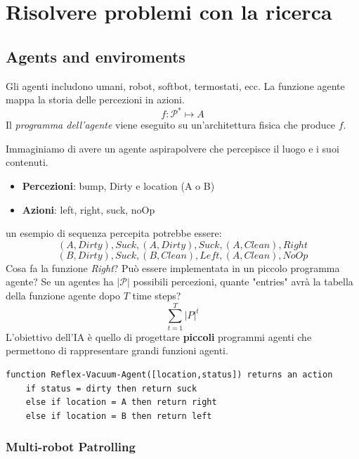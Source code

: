 \documentclass[a4paper]{article}
\begin{document}
\section{Risolvere problemi con la ricerca}

\subsection{Agents and enviroments}

Gli agenti includono umani, robot, softbot, termostati, ecc. La funzione
agente mappa la storia delle percezioni in azioni.
\[f : \mathcal{P}^* \mapsto A\]
Il \textit{programma dell'agente} viene eseguito su un'architettura fisica che produce
$f$.

\ex{}
{
    Immaginiamo di avere un agente aspirapolvere che percepisce
    il luogo e i suoi contenuti.
    \begin{itemize}
        \item \textbf{Percezioni}: bump, Dirty e location (A o B)
        \item \textbf{Azioni}: left, right, suck, noOp
    \end{itemize}
    un esempio di sequenza percepita potrebbe essere:
    \[(A, Dirty), Suck, (A, Dirty), Suck, (A, Clean), Right\] \[ 
    (B, Dirty), Suck, (B, Clean), Left, (A, Clean), NoOp\]
    Cosa fa la funzione \textit{Right}? Può essere implementata
    in un piccolo programma agente?
    Se un agentes ha $|\mathcal{P}|$ possibili percezioni, quante
    "entries" avrà la tabella della funzione agente dopo $T$ time steps?
    \[\sum_{t=1}^{T} |P|^t\]
    L'obiettivo dell'IA è quello di progettare \textbf{piccoli}
    programmi agenti che permettono di rappresentare grandi funzioni agenti.
}
\noindent
\begin{verbatim}
function Reflex-Vacuum-Agent([location,status]) returns an action
    if status = dirty then return suck
    else if location = A then return right
    else if location = B then return left
\end{verbatim}
\noindent

\subsubsection{Multi-robot Patrolling}
\end{document}
